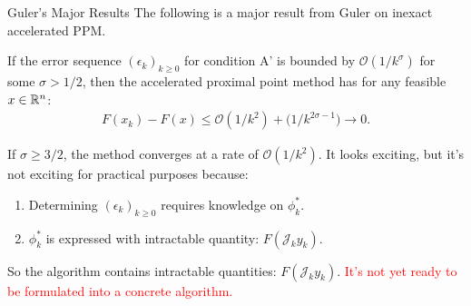 \documentclass[11pt]{beamer}
\begin{document}
        \begin{frame}{Guler's Major Results}
            The following is a major result from Guler \cite{guler_new_1992} on inexact accelerated PPM. 
            \begin{theorem}
                If the error sequence $(\epsilon_k)_{k \ge0}$ for condition A' is bounded by $\mathcal O(1/k^\sigma)$ for some $\sigma > 1/2$, then the accelerated proximal point method has for any feasible $x \in \mathbb R^n$: 
                \begin{align*}
                    F(x_k) - F(x) \le \mathcal O(1/k^2) + \mathcal (1 / k^{2\sigma - 1}) \rightarrow 0. 
                \end{align*}    
            \end{theorem}
            If $\sigma \ge 3/2$, the method converges at a rate of $\mathcal O(1/k^2)$. 
            \pause 
            It looks exciting, but it's not exciting for practical purposes because: 
            \begin{enumerate}
                \item Determining $(\epsilon_k)_{k\ge 0}$ requires knowledge on $\phi_k^*$. 
                \item $\phi_k^*$ is expressed with intractable quantity: $F(\mathcal J_k y_k)$. 
            \end{enumerate}
            So the algorithm contains intractable quantities: $F(\mathcal J_k y_k)$. 
            \textcolor{red}{It's not yet ready to be formulated into a concrete algorithm.}
        \end{frame}
\end{document}
